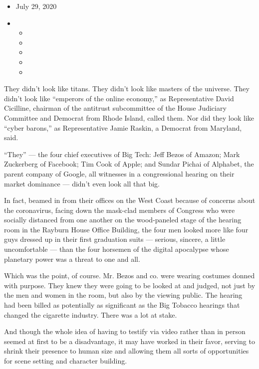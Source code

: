\begin{itemize}
\item
  July 29, 2020
\item
  \begin{itemize}
  \item
  \item
  \item
  \item
  \item
  \end{itemize}
\end{itemize}

They didn't look like titans. They didn't look like masters of the
universe. They didn't look like ``emperors of the online economy,'' as
Representative David Cicilline, chairman of the antitrust subcommittee
of the House Judiciary Committee and Democrat from Rhode Island, called
them. Nor did they look like ``cyber barons,'' as Representative Jamie
Raskin, a Democrat from Maryland, said.

``They'' --- the four chief executives of Big Tech: Jeff Bezos of
Amazon; Mark Zuckerberg of Facebook; Tim Cook of Apple; and Sundar
Pichai of Alphabet, the parent company of Google, all witnesses in a
congressional hearing on their market dominance --- didn't even look all
that big.

In fact, beamed in from their offices on the West Coast because of
concerns about the coronavirus, facing down the mask-clad members of
Congress who were socially distanced from one another on the
wood-paneled stage of the hearing room in the Rayburn House Office
Building, the four men looked more like four guys dressed up in their
first graduation suits --- serious, sincere, a little uncomfortable ---
than the four horsemen of the digital apocalypse whose planetary power
was a threat to one and all.

Which was the point, of course. Mr. Bezos and co. were wearing costumes
donned with purpose. They knew they were going to be looked at and
judged, not just by the men and women in the room, but also by the
viewing public. The hearing had been billed as potentially as
significant as the Big Tobacco hearings that changed the cigarette
industry. There was a lot at stake.

And though the whole idea of having to testify via video rather than in
person seemed at first to be a disadvantage, it may have worked in their
favor, serving to shrink their presence to human size and allowing them
all sorts of opportunities for scene setting and character building.

